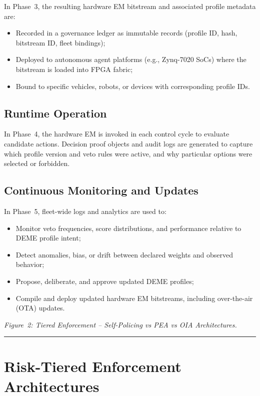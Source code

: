 \documentclass[11pt]{article}
\begin{document}
In Phase~3, the resulting hardware EM bitstream and associated profile metadata are:

\begin{itemize}
  \item Recorded in a governance ledger as immutable records (profile ID, hash, bitstream ID, fleet bindings);
  \item Deployed to autonomous agent platforms (e.g., Zynq-7020 SoCs) where the bitstream is loaded into FPGA fabric;
  \item Bound to specific vehicles, robots, or devices with corresponding profile IDs.
\end{itemize}

\subsection{Runtime Operation}

In Phase~4, the hardware EM is invoked in each control cycle to evaluate candidate actions. Decision proof objects and audit logs are generated to capture which profile version and veto rules were active, and why particular options were selected or forbidden.

\subsection{Continuous Monitoring and Updates}

In Phase~5, fleet-wide logs and analytics are used to:

\begin{itemize}
  \item Monitor veto frequencies, score distributions, and performance relative to DEME profile intent;
  \item Detect anomalies, bias, or drift between declared weights and observed behavior;
  \item Propose, deliberate, and approve updated DEME profiles;
  \item Compile and deploy updated hardware EM bitstreams, including over-the-air (OTA) updates.
\end{itemize}

\medskip
\noindent\emph{Figure~2: Tiered Enforcement -- Self-Policing vs PEA vs OIA Architectures.}

\hrule
\vspace{1em}

\section{Risk-Tiered Enforcement Architectures}
\end{document}
